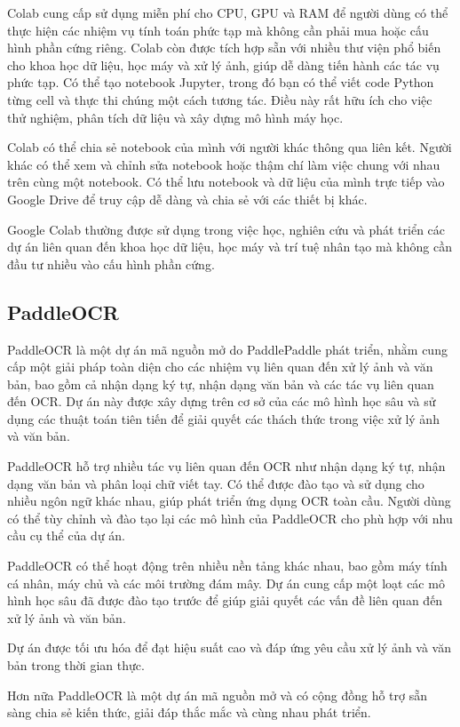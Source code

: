 Colab cung cấp sử dụng miễn phí cho CPU, GPU và RAM để người dùng có thể thực hiện các nhiệm vụ tính toán phức tạp mà không cần phải mua hoặc cấu hình phần cứng riêng. Colab còn được tích hợp sẵn với nhiều thư viện phổ biến cho khoa học dữ liệu, học máy và xử lý ảnh, giúp dễ dàng tiến hành các tác vụ phức tạp. Có thể tạo notebook Jupyter, trong đó bạn có thể viết code Python từng cell và thực thi chúng một cách tương tác. Điều này rất hữu ích cho việc thử nghiệm, phân tích dữ liệu và xây dựng mô hình máy học.

Colab có thể chia sẻ notebook của mình với người khác thông qua liên kết. Người khác có thể xem và chỉnh sửa notebook hoặc thậm chí làm việc chung với nhau trên cùng một notebook. Có thể lưu notebook và dữ liệu của mình trực tiếp vào Google Drive để truy cập dễ dàng và chia sẻ với các thiết bị khác.

Google Colab thường được sử dụng trong việc học, nghiên cứu và phát triển các dự án liên quan đến khoa học dữ liệu, học máy và trí tuệ nhân tạo mà không cần đầu tư nhiều vào cấu hình phần cứng.

\subsection{PaddleOCR}
PaddleOCR là một dự án mã nguồn mở do PaddlePaddle phát triển, nhằm cung cấp một giải pháp toàn diện cho các nhiệm vụ liên quan đến xử lý ảnh và văn bản, bao gồm cả nhận dạng ký tự, nhận dạng văn bản và các tác vụ liên quan đến OCR. Dự án này được xây dựng trên cơ sở của các mô hình học sâu và sử dụng các thuật toán tiên tiến để giải quyết các thách thức trong việc xử lý ảnh và văn bản.

PaddleOCR hỗ trợ nhiều tác vụ liên quan đến OCR như nhận dạng ký tự, nhận dạng văn bản và phân loại chữ viết tay. Có thể được đào tạo và sử dụng cho nhiều ngôn ngữ khác nhau, giúp phát triển ứng dụng OCR toàn cầu. Người dùng có thể tùy chỉnh và đào tạo lại các mô hình của PaddleOCR cho phù hợp với nhu cầu cụ thể của dự án.

PaddleOCR có thể hoạt động trên nhiều nền tảng khác nhau, bao gồm máy tính cá nhân, máy chủ và các môi trường đám mây. Dự án cung cấp một loạt các mô hình học sâu đã được đào tạo trước để giúp giải quyết các vấn đề liên quan đến xử lý ảnh và văn bản.

Dự án được tối ưu hóa để đạt hiệu suất cao và đáp ứng yêu cầu xử lý ảnh và văn bản trong thời gian thực.

Hơn nữa PaddleOCR là một dự án mã nguồn mở và có cộng đồng hỗ trợ sẵn sàng chia sẻ kiến thức, giải đáp thắc mắc và cùng nhau phát triển.

